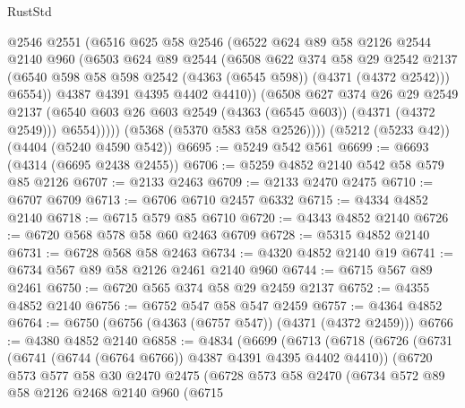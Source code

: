 \begin{lexlean}{RustStd}
\begin{coremodule}
                @2546
                @2551
                (@6516
                  @625
                  @58
                  @2546
                  (@6522
                    @624
                    @89
                    @58
                    @2126
                    @2544
                    @2140
                    @960
                    (@6503
                      @624
                      @89
                      @2544
                      (@6508
                        @622
                        @374
                        @58
                        @29
                        @2542
                        @2137
                        (@6540 @598 @58 @598 @2542 (@4363 (@6545 @598)) (@4371 (@4372 @2542)))
                        @6554))
                    @4387
                    @4391
                    @4395
                    @4402
                    @4410))
                (@6508
                  @627
                  @374
                  @26
                  @29
                  @2549
                  @2137
                  (@6540 @603 @26 @603 @2549 (@4363 (@6545 @603)) (@4371 (@4372 @2549)))
                  @6554)))))
        (@5368 (@5370 @583 @58 @2526))))
    (@5212 (@5233 @42))
    (@4404 (@5240 @4590 @542))
@6695 := @5249 @542 @561
@6699 := @6693 (@4314 (@6695 @2438 @2455))
@6706 := @5259 @4852 @2140 @542 @58 @579 @85 @2126
@6707 := @2133 @2463
@6709 := @2133 @2470 @2475
@6710 := @6707 @6709
@6713 := @6706 @6710 @2457 @6332
@6715 := @4334 @4852 @2140
@6718 := @6715 @579 @85 @6710
@6720 := @4343 @4852 @2140
@6726 := @6720 @568 @578 @58 @60 @2463 @6709
@6728 := @5315 @4852 @2140
@6731 := @6728 @568 @58 @2463
@6734 := @4320 @4852 @2140 @19
@6741 := @6734 @567 @89 @58 @2126 @2461 @2140 @960
@6744 := @6715 @567 @89 @2461
@6750 := @6720 @565 @374 @58 @29 @2459 @2137
@6752 := @4355 @4852 @2140
@6756 := @6752 @547 @58 @547 @2459
@6757 := @4364 @4852
@6764 := @6750 (@6756 (@4363 (@6757 @547)) (@4371 (@4372 @2459)))
@6766 := @4380 @4852 @2140
@6858 := @4834
    (@6699
      (@6713
        (@6718
          (@6726
            (@6731 (@6741 (@6744 (@6764 @6766)) @4387 @4391 @4395 @4402 @4410))
            (@6720
              @573
              @577
              @58
              @30
              @2470
              @2475
              (@6728
                @573
                @58
                @2470
                (@6734
                  @572
                  @89
                  @58
                  @2126
                  @2468
                  @2140
                  @960
                  (@6715

\end{coremodule}
\end{lexlean}

